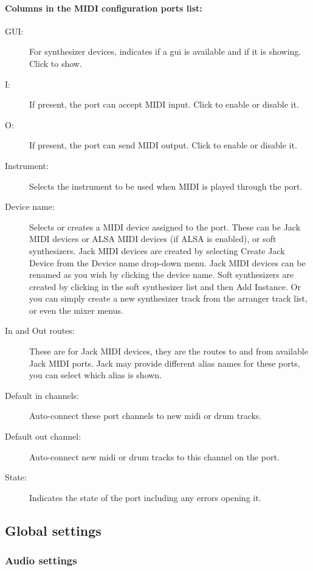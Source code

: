 \documentclass[a4paper]{report}
\begin{document}
\paragraph{Columns in the MIDI configuration ports list:}
\begin{description}
\item [{GUI:}] For synthesizer devices, indicates if a gui is available
and if it is showing. Click to show.
\item [{I:}] If present, the port can accept MIDI input. Click to
enable or disable it.
\item [{O:}] If present, the port can send MIDI output. Click to enable
or disable it.
\item [{Instrument:}] Selects the instrument to be used when MIDI is
played through the port.
\item [{Device name:}] Selects or creates a MIDI device assigned to the
port. These can be Jack MIDI devices or ALSA MIDI devices (if ALSA is
enabled), or soft synthesizers. Jack MIDI devices are created by selecting
Create Jack Device from the Device name drop-down menu. Jack MIDI devices
can be renamed as you wish by clicking the device name. Soft synthesizers
are created by clicking in the soft synthesizer list and then Add
Instance. Or you can simply create a new synthesizer track from the
arranger track list, or even the mixer menus.
\item [{In and Out routes:}] These are for Jack MIDI devices, they are
the routes to and from available Jack MIDI ports. Jack may provide
different alias names for these ports, you can select which alias
is shown.
\item [{Default in channels:}] Auto-connect these port channels to
new midi or drum tracks.
\item [{Default out channel:}] Auto-connect new midi or drum tracks
to this channel on the port.
\item [{State:}] Indicates the state of the port including any errors
opening it.
\end{description}

\subsection{Global settings}
\subsubsection{Audio settings}
\end{document}
